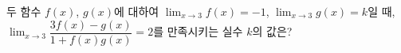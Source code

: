 두 함수 $f(x)$, $g(x)$에 대하여 $\displaystyle\lim_{x\to 3} f(x)=-1$, $\displaystyle\lim_{x\to 3} g(x)=k$일 때, $\displaystyle\lim_{x\to 3}\dfrac{3f(x)-g(x)}{1+f(x)g(x)}=2$를 만족시키는 실수 $k$의 값은?
